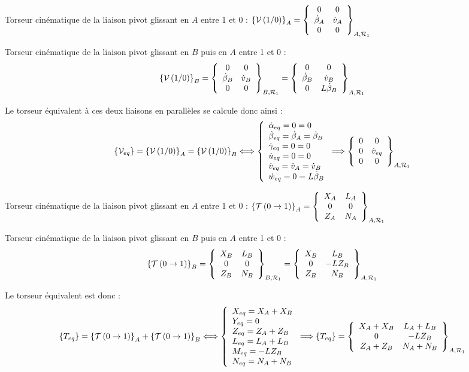 \documentclass[10pt]{article}
\begin{document}
\noindent\colorbox{grisf}{}
Torseur cinématique de la liaison pivot glissant en $A$ entre 1 et 0 : 
$\torseurcin{V}{1}{0}_{A}=\torseurcol{0}{\dot{\beta}_A}{0}{0}{\dot{v}_A}{0}{A,\mathcal{R}_1}$

Torseur cinématique de la liaison pivot glissant en $B$ puis en $A$ entre 1 et 0 : 
$$\torseurcin{V}{1}{0}_{B}
=\torseurcol{0}{\dot{\beta}_B}{0}{0}{\dot{v}_B}{0}{B,\mathcal{R}_1}
=\torseurcol{0}{\dot{\beta}_B}{0}{0}{\dot{v}_B}{L\dot{\beta}_B}{A,\mathcal{R}_1}
$$


Le torseur équivalent à ces deux liaisons en parallèles se calcule donc ainsi :
$$\{\mathcal{V}_{eq}\}=\torseurcin{V}{1}{0}_{A}=\torseurcin{V}{1}{0}_{B}
\Longleftrightarrow
\left\{
\begin{array}{l}
\dot{\alpha}_{eq}=0=0\\
\dot{\beta}_{eq}=\dot{\beta}_A=\dot{\beta}_B\\
\dot{\gamma}_{eq}=0=0\\
\dot{u}_{eq}=0=0\\
\dot{v}_{eq}=\dot{v}_A=\dot{v}_B\\
\dot{w}_{eq}=0=L\dot{\beta}_B\\
\end{array}
\right.
\Longrightarrow
\torseurcol{0}{0}{0}{0}{\dot{v}_{eq}}{0}{A,\mathcal{R}_1}
$$


\noindent\colorbox{grisf}{}

Torseur cinématique de la liaison pivot glissant en $A$ entre 1 et 0 : 
$\torseurstat{T}{0}{1}_{A}=\torseurcol{X_A}{0}{Z_A}{L_A}{0}{N_A}{A,\mathcal{R}_1}$

Torseur cinématique de la liaison pivot glissant en $B$ puis en $A$ entre 1 et 0 : 
$$\torseurstat{T}{0}{1}_{B}
=\torseurcol{X_B}{0}{Z_B}{L_B}{0}{N_B}{B,\mathcal{R}_1}
=\torseurcol{X_B}{0}{Z_B}{L_B}{-LZ_B}{N_B}{A,\mathcal{R}_1}
$$

Le torseur équivalent est donc :
$$
\{ T_{eq}\}=\torseurstat{T}{0}{1}_{A}+\torseurstat{T}{0}{1}_{B} 
\Longleftrightarrow
\left\{
\begin{array}{l}
X_{eq}=X_A+X_B\\
Y_{eq}=0\\
Z_{eq}=Z_A+Z_B\\
L_{eq}=L_A+L_B\\
M_{eq}=-LZ_B\\
N_{eq}=N_A+N_B\\
\end{array}
\right.
\Longrightarrow
\{ T_{eq}\}=\torseurcol{X_A+X_B}{0}{Z_A+Z_B}{L_A+L_B}{-LZ_B}{N_A+N_B}{A,\mathcal{R}_1}
$$
\end{document}
